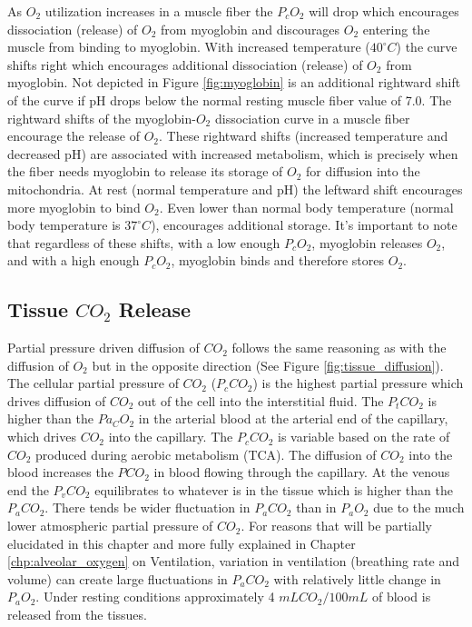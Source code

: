 As $O_2$ utilization increases in a muscle fiber the $P_cO_2$ will drop which encourages dissociation (release) of $O_2$ from myoglobin and discourages $O_2$ entering the muscle from binding to myoglobin. With increased temperature ($40^{\circ} C$) the curve shifts right which encourages additional dissociation (release) of $O_2$ from myoglobin. Not depicted in Figure \ref{fig:myoglobin} is an additional rightward shift of the curve if pH drops below the normal resting muscle fiber value of 7.0. The rightward shifts of the myoglobin-$O_2$ dissociation curve in a muscle fiber encourage the release of $O_2$. These rightward shifts (increased temperature and decreased pH) are associated with increased metabolism, which is precisely when the fiber needs myoglobin to release its storage of $O_2$ for diffusion into the mitochondria. At rest (normal temperature and pH) the leftward shift encourages more myoglobin to bind $O_2$. Even lower than normal body temperature (normal body temperature is $37^{\circ} C$), encourages additional storage. It's important to note that regardless of these shifts, with a low enough $P_cO_2$, myoglobin releases $O_2$, and with a high enough $P_cO_2$, myoglobin binds and therefore stores $O_2$.


\subsection{Tissue $CO_2$ Release}
Partial pressure driven diffusion of $CO_2$ follows the same reasoning as with the diffusion of $O_2$ but in the opposite direction (See Figure \ref{fig:tissue_diffusion}). The cellular partial pressure of $CO_2$ ($P_cCO_2$) is the highest partial pressure which drives diffusion of $CO_2$ out of the cell into the interstitial fluid. The $P_tCO_2$ is higher than the $Pa_CO_2$ in the arterial blood at the arterial end of the capillary, which drives $CO_2$ into the capillary. The $P_cCO_2$ is variable based on the rate of $CO_2$ produced during aerobic metabolism (TCA). The diffusion of $CO_2$ into the blood increases the $PCO_2$ in blood flowing through the capillary. At the venous end the $P_vCO_2$ equilibrates to whatever is in the tissue which is higher than the $P_aCO_2$. There tends be wider fluctuation in $P_aCO_2$ than in $P_aO_2$ due to the much lower atmospheric partial pressure of $CO_2$. For reasons that will be partially elucidated in this chapter and more fully explained in Chapter \ref{chp:alveolar_oxygen} on Ventilation, variation in ventilation (breathing rate and volume) can create large fluctuations in $P_aCO_2$ with relatively little change in $P_aO_2$. Under resting conditions approximately 4 $mL CO_2 / 100 mL$ of blood is released from the tissues. 

